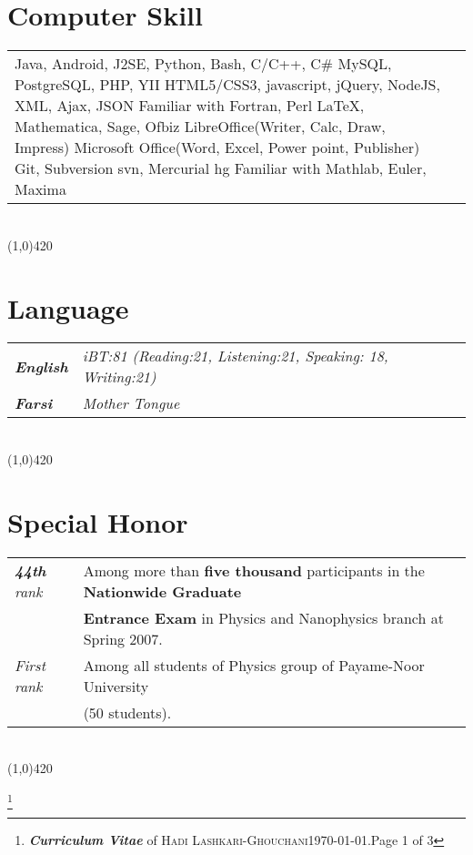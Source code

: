 \documentclass[10pt]{article}
\newcommand{\maxpages}{3}
\newcommand{\maxpages}{3}
\newcommand\HRule{\hspace*{.8cm}\line(1,0){420}\\}
\newenvironment{Record}[1]
{
    \vspace{-0.35cm}
    \section*{#1}
        \vspace{-0.1cm}
        \begin{tabular}
}
{
        \end{tabular}\\
        \HRule
}
\newcommand{\FootNote}[1]{\let\thefootnote\relax\footnote{\textbf{\textit{Curriculum Vitae}} of \textsc{Hadi Lashkari-Ghouchani}\qquad\today.\qquad Page #1 of \maxpages}}
\begin{document}
\begin{Record}{Computer Skill}{l l}
    \ComputerSkill{Programming}
        {Java, Android, J2SE, Python, Bash, C/C++, C\#}
        {MySQL, PostgreSQL, PHP, YII}
        {HTML5/CSS3, javascript, jQuery, NodeJS, XML, Ajax, JSON}
        {Familiar with Fortran, Perl}{}%
    \ComputerSkill{OS}{Linux(Ubuntu, Debian, OpenSUSE), Windows}{}{}{}{}%
    \ComputerSkill{Special Software}
        {\LaTeX, Mathematica, Sage, Ofbiz}
        {LibreOffice(Writer, Calc, Draw, Impress)}
        {Microsoft Office(Word, Excel, Power point, Publisher)}
        {Git, Subversion svn, Mercurial hg}
        {Familiar with Mathlab, Euler, Maxima}%
\end{Record}


\newcommand{\Language}[2]{
    \textbf{\textsl{#1}}&\textit{#2}\\
}
\begin{Record}{Language}{l l}
    \Language{English}
        {iBT:81 (Reading:21, Listening:21, Speaking: 18, Writing:21)}%
    \Language{Farsi}{Mother Tongue}%
\end{Record}

\newcommand{\SpecialHonor}[3]{
    \textsl{ #1}&#2\\
    &#3\\
}
\begin{Record}{Special Honor}{l l}
    \SpecialHonor{\textbf{44th} rank}
        {Among more than \textbf{five thousand} participants in the \textbf{Nationwide Graduate}}
        {\textbf{Entrance Exam} in Physics and Nanophysics branch at Spring 2007.}%
    \SpecialHonor{First rank}
        {Among all students of Physics group of Payame-Noor University}
        {(50 students).}%
\end{Record}



\FootNote{1}

\end{document}
